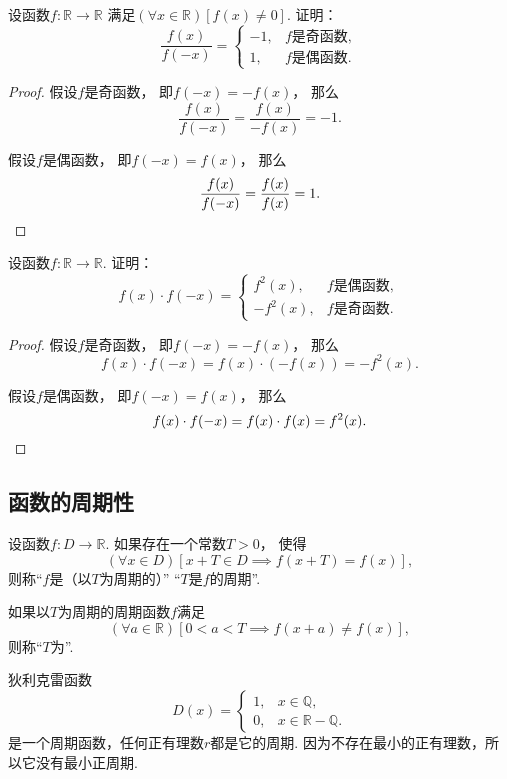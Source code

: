 \begin{example}
设函数\(f\colon\mathbb{R}\to\mathbb{R}\)
满足\((\forall x\in\mathbb{R})[f(x)\neq0]\).
证明：\[
	\frac{f(x)}{f(-x)} = \left\{ \begin{array}{rl}
		-1, & \text{$f$是奇函数}, \\
		1, & \text{$f$是偶函数}.
	\end{array} \right.
\]
\begin{proof}
假设\(f\)是奇函数，
即\(f(-x)=-f(x)\)，
那么\[
	\frac{f(x)}{f(-x)}
	=\frac{f(x)}{-f(x)}
	=-1.
\]

假设\(f\)是偶函数，
即\(f(-x)=f(x)\)，
那么\[
	\frac{f(x)}{f(-x)}
	=\frac{f(x)}{f(x)}
	=1.
	\qedhere
\]
\end{proof}
\end{example}

\begin{example}
设函数\(f\colon\mathbb{R}\to\mathbb{R}\).
证明：\[
	f(x) \cdot f(-x) = \left\{ \begin{array}{rl}
		f^2(x), & \text{$f$是偶函数}, \\
		-f^2(x), & \text{$f$是奇函数}.
	\end{array} \right.
\]
\begin{proof}
假设\(f\)是奇函数，
即\(f(-x)=-f(x)\)，
那么\[
	f(x) \cdot f(-x)
	=f(x) \cdot (-f(x))
	=-f^2(x).
\]

假设\(f\)是偶函数，
即\(f(-x)=f(x)\)，
那么\[
	f(x) \cdot f(-x)
	=f(x) \cdot f(x)
	=f^2(x).
	\qedhere
\]
\end{proof}
\end{example}

\subsection{函数的周期性}
\begin{definition}
设函数\(f\colon D\to\mathbb{R}\).
如果存在一个常数\(T>0\)，
使得\[
	(\forall x \in D)
	[x+T \in D \implies f(x+T) = f(x)],
\]
则称“\(f\)是（以\(T\)为周期的）”
“\(T\)是\(f\)的周期”.

如果以\(T\)为周期的周期函数\(f\)满足\[
	(\forall a\in\mathbb{R})
	[0<a<T \implies f(x+a) \neq f(x)],
\]
则称“\(T\)为”.
\end{definition}

\begin{example}
狄利克雷函数\[
	D(x) = \left\{ \begin{array}{ll}
		1, & x \in \mathbb{Q}, \\
		0, & x \in \mathbb{R}-\mathbb{Q}.
	\end{array} \right.
\]是一个周期函数，任何正有理数\(r\)都是它的周期.
因为不存在最小的正有理数，所以它没有最小正周期.
\end{example}

